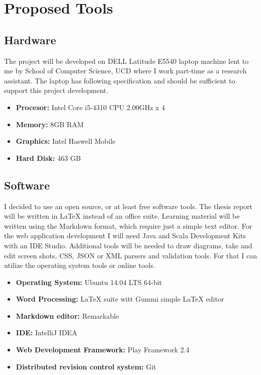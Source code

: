 \documentclass[12pt,twoside,a4paper]{report}
\begin{document}
\section{Proposed Tools}\label{3.3}

\subsection{Hardware}\label{3.3.1}
The project will be developed on DELL Latitude E5540 laptop machine lent to me by School of Computer Science, UCD where I work part-time as a research assistant. The laptop has following specification and should be sufficient to support this project development.

\begin{itemize}\itemsep1pt \parskip0pt 
\item \textbf{Procesor:} Intel Core i5-4310 CPU 2.00GHz x 4
\item \textbf{Memory:} 8GB RAM
\item \textbf{Graphics:} Intel Haswell Mobile
\item \textbf{Hard Disk:} 463 GB
\end{itemize}

\subsection{Software}\label{3.3.2}
I decided to use an open source, or at least free software tools. The thesis report will be written in LaTeX instead of an office suite.  Learning material will be written using the Markdown format, which require just a simple text editor. For the web application development I will need Java and Scala Development Kits with an IDE Studio. Additional tools will be needed to draw diagrams, take and edit screen shots, CSS, JSON or XML parsers and validation tools. For that I can utilize the operating system tools or online tools.

\begin{itemize}\itemsep1pt \parskip0pt 
\item \textbf{Operating System:} Ubuntu 14.04 LTS 64-bit\cite{21}
\item \textbf{Word Processing:} LaTeX suite witt Gummi simple LaTeX editor\cite{22}
\item \textbf{Markdown editor:} Remarkable\cite{23}
\item \textbf{IDE:} IntelliJ IDEA\cite{24}
\item \textbf{Web Development Framework:} Play Framework 2.4\cite{28}
\item \textbf{Distributed revision control system:} Git\cite{25}
\end{itemize}
\end{document}
